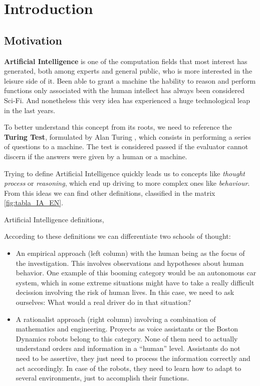 \chapter{Introduction}



\section{Motivation}

\textbf{Artificial Intelligence} is one of the computation fields that most interest has generated, both among experts and general public, who is more interested in the leisure side of it. Been able to grant a machine the hability to reason and perform functions only associated with the human intellect has always been considered Sci-Fi. And nonetheless this very idea has experienced a huge technological leap in the last years.

To better understand this concept from its roots, we need to reference the \textbf{Turing Test}, formulated by Alan Turing \citep{Turing1950-TURCMA}, which consists in performing a series of questions to a machine. The test is considered passed if the evaluator cannot discern if the answers were given by a human or a machine.

Trying to define Artificial Intelligence quickly leads us to concepts like \textit{thought process} or \textit{reasoning}, which end up driving to more complex ones like \textit{behaviour}. From this ideas we can find other definitions, classified in the matrix \ref{fig:tabla_IA_EN}.

%
       {Artificial Intelligence definitions, \citet{Russell:2009:AIM:1671238}}

According to these definitions we can differentiate two schools of thought:
\begin{itemize}
    \item An empirical approach (left column) with the human being as the focus of the investigation. This involves observations and hypotheses about human behavior. One example of this booming category would be an autonomous car system, which in some extreme situations might have to take a really difficult decission involving the risk of human lives. In this case, we need to ask ourselves: What would a real driver do in that situation?
    \item A rationalist approach (right column) involving a combination of mathematics and engineering. Proyects as voice assistants or the Boston Dynamics robots belong to this category. None of them need to actually understand orders and information in a ``human'' level. Assistants do not need to be assertive, they just need to process the information correctly and act accordingly. In case of the robots, they need to learn how to adapt to several environments, just to accomplish their functions.
\end{itemize}

